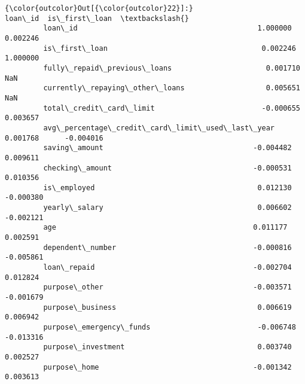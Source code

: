 \documentclass{report}
\begin{document}
            \begin{Verbatim}[commandchars=\\\{\}]
{\color{outcolor}Out[{\color{outcolor}22}]:}                                                   loan\_id  is\_first\_loan  \textbackslash{}
         loan\_id                                          1.000000       0.002246   
         is\_first\_loan                                    0.002246       1.000000   
         fully\_repaid\_previous\_loans                      0.001710            NaN   
         currently\_repaying\_other\_loans                   0.005651            NaN   
         total\_credit\_card\_limit                         -0.000655       0.003657   
         avg\_percentage\_credit\_card\_limit\_used\_last\_year  0.001768      -0.004016   
         saving\_amount                                   -0.004482       0.009611   
         checking\_amount                                 -0.000531       0.010356   
         is\_employed                                      0.012130      -0.000380   
         yearly\_salary                                    0.006602      -0.002121   
         age                                              0.011177       0.002591   
         dependent\_number                                -0.000816      -0.005861   
         loan\_repaid                                     -0.002704       0.012824   
         purpose\_other                                   -0.003571      -0.001679   
         purpose\_business                                 0.006619       0.006942   
         purpose\_emergency\_funds                         -0.006748      -0.013316   
         purpose\_investment                               0.003740       0.002527   
         purpose\_home                                    -0.001342       0.003613   
         

\end{Verbatim}
\end{document}
